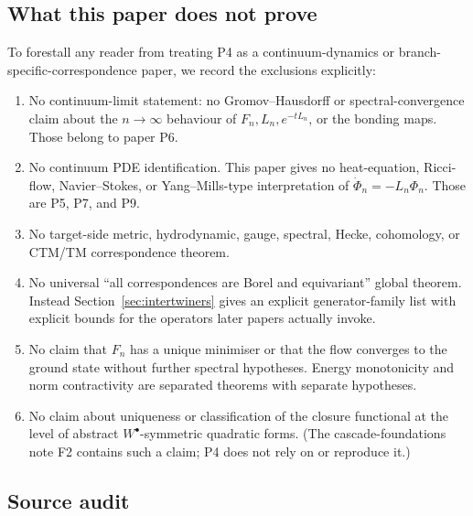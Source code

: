 \documentclass[11pt, a4paper]{amsart}
\theoremstyle{definition}
\begin{document}
\subsection{What this paper does not prove}

To forestall any reader from treating P4 as a continuum-dynamics
or branch-specific-correspondence paper, we record the exclusions
explicitly:

\begin{enumerate}
\item No continuum-limit statement: no Gromov--Hausdorff or
  spectral-convergence claim about the $n \to \infty$ behaviour
  of $F_n, L_n, e^{-tL_n}$, or the bonding maps. Those belong to
  paper P6.
\item No continuum PDE identification. This paper gives no
  heat-equation, Ricci-flow, Navier--Stokes, or Yang--Mills-type
  interpretation of $\dot\Phi_n = -L_n \Phi_n$. Those are P5, P7,
  and P9.
\item No target-side metric, hydrodynamic, gauge, spectral,
  Hecke, cohomology, or CTM/TM correspondence theorem.
\item No universal ``all correspondences are Borel and
  equivariant'' global theorem. Instead
  Section~\ref{sec:intertwiners} gives an explicit generator-family list
  with explicit bounds for the operators later papers actually
  invoke.
\item No claim that $F_n$ has a unique minimiser or that the flow
  converges to the ground state without further spectral
  hypotheses. Energy monotonicity and norm contractivity are
  separated theorems with separate hypotheses.
\item No claim about uniqueness or classification of the closure
  functional at the level of abstract $W^\bullet$-symmetric
  quadratic forms. (The cascade-foundations note F2 contains such
  a claim; P4 does not rely on or reproduce it.)
\end{enumerate}

\subsection{Source audit}
\end{document}
